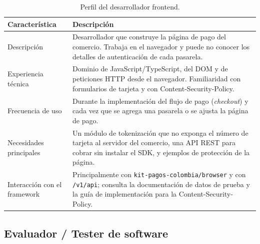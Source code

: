 \begin{table}[H]
  \centering
  \renewcommand{\arraystretch}{1.2}
  \begin{tabularx}{\textwidth}{|l|X|}
    \hline
    \textbf{Característica} & \textbf{Descripción} \\
    \hline
    Descripción & Desarrollador que construye la página de pago del comercio. Trabaja en el navegador y puede no conocer los detalles de autenticación de cada pasarela. \\
    \hline
    Experiencia técnica & Dominio de JavaScript/TypeScript, del DOM y de peticiones HTTP desde el navegador. Familiaridad con formularios de tarjeta y con Content-Security-Policy. \\
    \hline
    Frecuencia de uso & Durante la implementación del flujo de pago (\textit{checkout}) y cada vez que se agrega una pasarela o se ajusta la página de pago. \\
    \hline
    Necesidades principales & Un módulo de tokenización que no exponga el número de tarjeta al servidor del comercio, una API REST para cobrar sin instalar el SDK, y ejemplos de protección de la página. \\
    \hline
    Interacción con el framework & Principalmente con \texttt{kit-pagos-colombia/browser} y con \texttt{/v1/api}; consulta la documentación de datos de prueba y la guía de implementación para la Content-Security-Policy. \\
    \hline
  \end{tabularx}
  \caption{Perfil del desarrollador frontend.}
  \label{tab:perfil-frontend}
\end{table}

\subsection{Evaluador / Tester de software}

